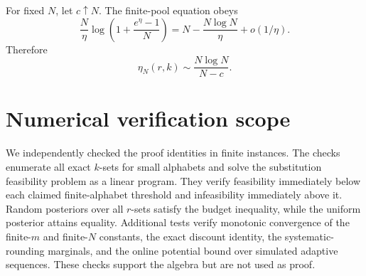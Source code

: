 \documentclass{article}
\theoremstyle{definition}
\theoremstyle{remark}
\newcommand{\1}{\mathbf 1}
\begin{document}
For fixed \(N\), let \(c\uparrow N\). The finite-pool equation obeys \[ \frac N\eta\log\left(1+\frac{e^\eta-1}{N}\right) =N-\frac{N\log N}{\eta}+o(1/\eta). \] Therefore \[ \eta_N(r,k)\sim\frac{N\log N}{N-c}. \]

\section{Numerical verification scope}
\label{app:verification}

We independently checked the proof identities in finite instances. The checks enumerate all exact \(k\)-sets for small alphabets and solve the substitution feasibility problem as a linear program. They verify feasibility immediately below each claimed finite-alphabet threshold and infeasibility immediately above it. Random posteriors over all \(r\)-sets satisfy the budget inequality, while the uniform posterior attains equality. Additional tests verify monotonic convergence of the finite-\(m\) and finite-\(N\) constants, the exact discount identity, the systematic-rounding marginals, and the online potential bound over simulated adaptive sequences. These checks support the algebra but are not used as proof.
\end{document}
